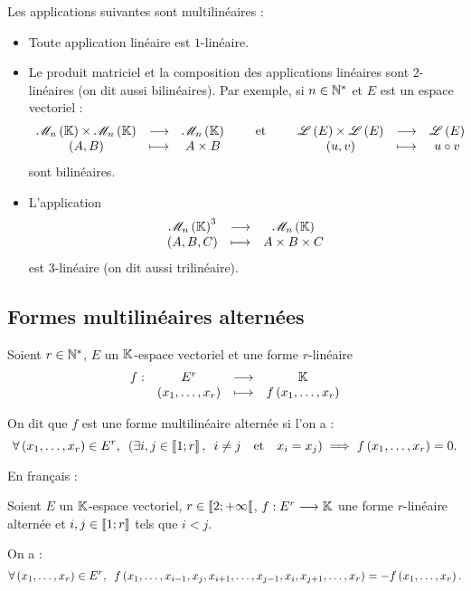 \begin{ex}
Les applications suivantes sont multilinéaires :

\begin{itemize}
    \item Toute application linéaire est \(1\)-linéaire. \\
    \item Le produit matriciel et la composition des applications linéaires sont \(2\)-linéaires (on dit aussi bilinéaires). Par exemple, si \(n\in\mathbb{N}^*\) et \(E\) est un espace vectoriel : \[\fonctionlambda{\M{n}\times\M{n}}{\M{n}}{\paren{A,B}}{A\times B}\qquad\text{et}\qquad\fonctionlambda{\Lendo{E}\times\Lendo{E}}{\Lendo{E}}{\paren{u,v}}{u\rond v}\] sont bilinéaires. \\
    \item L'application \[\fonctionlambda{\M{n}^3}{\M{n}}{\paren{A,B,C}}{A\times B\times C}\] est \(3\)-linéaire (on dit aussi trilinéaire).
\end{itemize}
\end{ex}

\subsection{Formes multilinéaires alternées}

\begin{defi}
Soient \(r\in\mathbb{N}^*\), \(E\) un \(\mathbb{K}\)-espace vectoriel et une forme \(r\)-linéaire \[\begin{array}[t]{cccc}f : & E^r & \longrightarrow & \mathbb{K} \\ & \left(x_1,\dots,x_r\right) & \longmapsto & f\left(x_1,\dots,x_r\right)\end{array}\]

On dit que \(f\) est une forme multilinéaire alternée si l'on a : \[\quantifs{\forall\paren{x_1,\dots,x_r}\in E^r}\paren{\quantifs{\exists i,j\in\interventierii{1}{r}}i\not=j\quad\text{et}\quad x_i=x_j}\imp f\paren{x_1,\dots,x_r}=0.\]

En français : 
\end{defi}

\begin{prop}
Soient \(E\) un \(\mathbb{K}\)-espace vectoriel, \(r\in\left\llbracket2;+\infty\right\llbracket\), \(f:E^r\longrightarrow\mathbb{K}\) une forme \(r\)-linéaire alternée et \(i,j\in\left\llbracket1;r\right\rrbracket\) tels que \(i<j\).

On a : \[\quantifs{\forall\paren{x_1,\dots,x_r}\in E^r}f\paren{x_1,\dots,x_{i-1},x_j,x_{i+1},\dots,x_{j-1},x_i,x_{j+1},\dots,x_r}=-f\paren{x_1,\dots,x_r}.\]
\end{prop}

